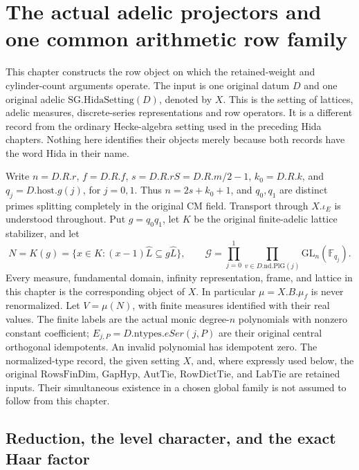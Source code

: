 \section{The actual adelic projectors and one common arithmetic row family}
\label{sec:arithmetic-rows-v46}

This chapter constructs the row object on which the retained-weight
and cylinder-count arguments operate.  The input is one original
datum \(D\) and one original adelic \(\mathrm{SG.HidaSetting}(D)\),
denoted by \(X\).  This is the setting of lattices, adelic measures,
discrete-series representations and row operators.  It is a different
record from the ordinary Hecke-algebra setting used in the preceding
Hida chapters.  Nothing here identifies their objects merely because
both records have the word Hida in their name.

Write \(n=D.R.r\), \(f=D.R.f\), \(s=D.R.rS=D.R.m/2-1\),
\(k_0=D.R.k\), and \(q_j=D.\mathrm{host}.g(j)\), for \(j=0,1\).
Thus \(n=2s+k_0+1\), and \(q_0,q_1\) are distinct primes splitting
completely in the original CM field.  Transport through \(X.\iota_E\)
is understood throughout.  Put \(g=q_0q_1\), let \(K\) be the
original finite-adelic lattice stabilizer, and let
\[
 N=K(g)=\{x\in K:(x-1)\widehat L\subseteq g\widehat L\},
 \qquad
 \mathcal G=\prod_{j=0}^1\prod_{v\in D.\mathrm{nd}.\mathrm{PlG}(j)}
                  \mathrm{GL}_n(\mathbb F_{q_j}).
 \tag{ARO.1}
\]
Every measure, fundamental domain, infinity representation, frame,
and lattice in this chapter is the corresponding object of \(X\).
In particular \(\mu=X.B.\mu_f\) is never renormalized.  Let
\(V=\mu(N)\), with finite measures identified with their real values.
The finite labels are the actual monic degree-\(n\) polynomials with
nonzero constant coefficient; \(E_{j,P}=D.\mathrm{ntypes}.eSer(j,P)\)
are their original central orthogonal idempotents.  An invalid
polynomial has idempotent zero.  The normalized-type record, the
given setting \(X\), and, where expressly used below, the original
\(\mathrm{RowsFinDim}\), \(\mathrm{GapHyp}\), \(\mathrm{AutTie}\),
\(\mathrm{RowDictTie}\), and \(\mathrm{LabTie}\) are retained inputs.
Their simultaneous existence in a chosen global family is not assumed
to follow from this chapter.

\subsection{Reduction, the level character, and the exact Haar factor}

